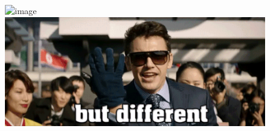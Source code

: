 \documentclass["WS\space 16-17\space -\space LaTeX-Kurs\space -\space Praesentation\space -\space 1.tex"]{subfiles}
\begin{document}
\begin{frame}[fragile]
  \begin{figure}
    \centering
    \includegraphics<1->[width=0.4\linewidth]{animation/same_but_different-10.png}
    \hspace{40pt}\includegraphics[width=0.4\linewidth]{animation/same_but_different-52.png}
  \end{figure}
  
\end{frame}
\end{document}

